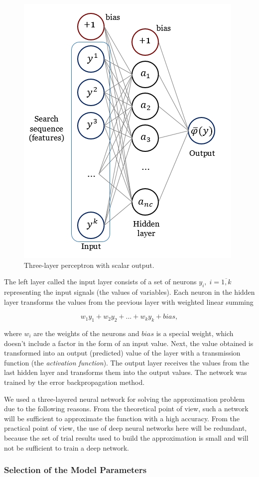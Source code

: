 \documentclass[mathematics,article,submit,pdftex,moreauthors]{Definitions/mdpi}
\begin{document}
\begin{figure}[H]
\begin{center}
\includegraphics[width=5 cm]{perceptron.jpg}
\caption{Three-layer perceptron with scalar output.\label{fig1}}
\end{center}
\end{figure}
\unskip

The left layer called the input layer consists of a set of neurons $y_i, \; i=\overline{1,k}$ representing the input signals (the values of variables). Each neuron in the hidden layer transforms the values from the previous layer with weighted linear summing 
\begin{linenomath}
\begin{equation}
w_1 y_1 + w_2 y_2+...+w_k y_k+bias,
\end{equation}
\end{linenomath}
where $w_i$ are the weights of the neurons and $bias$ is a special weight, which doesn't include a factor in the form of an input value. Next, the value obtained is transformed into an output (predicted) value of the layer with a transmission function (the \textit{activation function}). The output layer receives the values from the last hidden layer and transforms them into the output values. The network was trained by the error backpropagation method.

We used a three-layered neural network for solving the approximation problem due to the following reasons. From the theoretical point of view, such a network will be sufficient to approximate the function with a high accuracy. From the practical point of view, the use of deep neural networks here will be redundant, because the set of trial results used to build the approximation is small and will not be sufficient to train a deep network.

\subsubsection{Selection of the Model Parameters}
\end{document}

